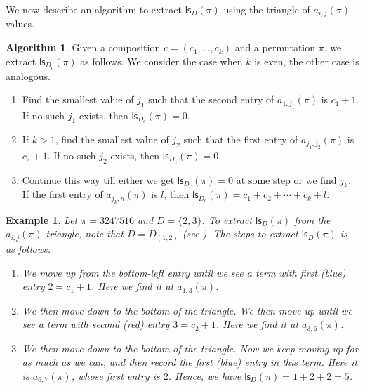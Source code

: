 \documentclass[12pt]{article}
\newcommand{\ls}{\mathsf{ls}}
\newtheorem{example}[theorem]{Example}
\theoremstyle{definition}
\newtheorem{algorithm}[theorem]{Algorithm}
\begin{document}
We now describe an algorithm to extract $\ls_D(\pi)$ using the triangle of $a_{i, j}(\pi)$ values.

\begin{algorithm}\label{lsDalgo}
Given a composition $c = (c_1, \ldots, c_k)$ and a permutation $\pi$, we extract $\ls_{D_c}(\pi)$ as follows. 
We consider the case when $k$ is even, the other case is analogous.
\begin{enumerate}
    \item Find the smallest value of $j_1$ such that the second entry of $a_{1, j_1}(\pi)$ is $c_1 + 1$. 
    If no such $j_1$ exists, then $\ls_{D_c}(\pi) = 0$.

    \item If $k > 1$, find the smallest value of $j_2$ such that the first entry of $a_{j_1, j_2}(\pi)$ is $c_2 + 1$. 
    If no such $j_2$ exists, then $\ls_{D_c}(\pi) = 0$.

    \item Continue this way till either we get $\ls_{D_c}(\pi) = 0$ at some step or we find $j_k$. 
    If the first entry of $a_{j_k, n}(\pi)$ is $l$, then $\ls_{D_c}(\pi) = c_1 + c_2 + \cdots + c_k + l$.
\end{enumerate}
\end{algorithm}

\begin{example}
    Let $\pi = 3247516$ and $D = \{2, 3\}$. 
    To extract $\ls_D(\pi)$ from the $a_{i, j}(\pi)$ triangle, note that $D = D_{(1, 2)}$ (see ). 
    The steps to extract $\ls_D(\pi)$ is as follows.
    \begin{enumerate}
        \item We move up from the bottom-left entry until we see a term with first (blue) entry $2 = c_1 + 1$. 
        Here we find it at $a_{1, 3}(\pi)$.

        \item  We then move down to the bottom of the triangle. 
        We then move up until we see a term with second (red) entry $3 = c_2 + 1$. 
        Here we find it at $a_{3, 6}(\pi)$.
        
        \item We then move down to the bottom of the triangle. 
        Now we keep moving up for as much as we can, and then record the first (blue) entry in this term. 
        Here it is $a_{6, 7}(\pi)$, whose first entry is $2$. 
        Hence, we have $\ls_D(\pi) = 1 + 2 + 2 = 5$.
    \end{enumerate}
\end{example}
\end{document}
